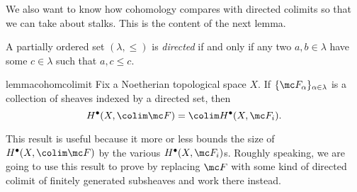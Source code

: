 \documentclass[../notes.tex]{subfiles}
\begin{document}
We also want to know how cohomology compares with directed colimits so that we can take about stalks. This is the content of the next lemma.
\begin{definition}
	A partially ordered set $(\lambda,\le)$ is \textit{directed} if and only if any two $a,b\in\lambda$ have some $c\in\lambda$ such that $a,c\le c$.
\end{definition}
\begin{restatable}{lemma}{cohomcolimit} \label{lem:cohom-colimit}
	Fix a Noetherian topological space $X$. If $\{\mc F_\alpha\}_{\alpha\in\lambda}$ is a collection of sheaves indexed by a directed set, then
	\[H^\bullet(X,\colim\mc F)=\colim H^\bullet(X,\mc F_i).\]
\end{restatable}
\noindent This result is useful because it more or less bounds the size of $H^\bullet(X,\colim\mc F)$ by the various $H^\bullet(X,\mc F_i)$s. Roughly speaking, we are going to use this result to prove  by replacing $\mc F$ with some kind of directed colimit of finitely generated subsheaves and work there instead.
\end{document}
